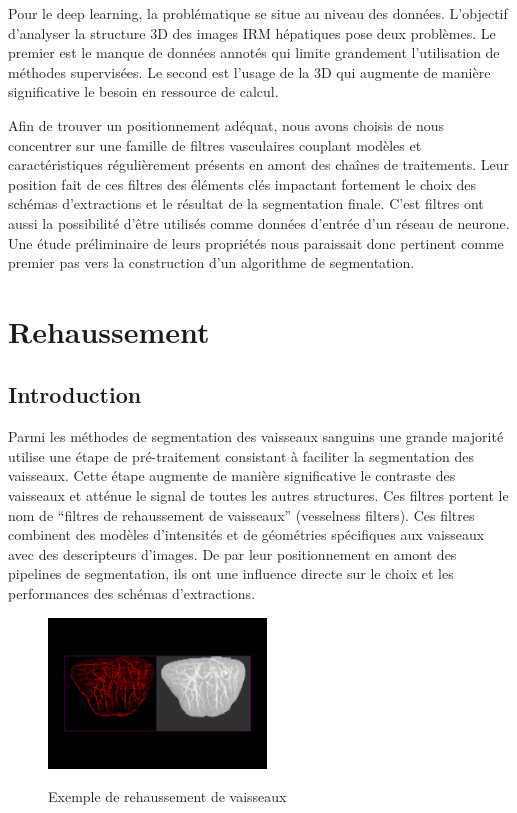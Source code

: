 Pour le deep learning, la problématique se situe au niveau des données. L'objectif d'analyser la structure 3D des images IRM hépatiques pose deux problèmes. Le premier est le manque de données annotés qui limite grandement l'utilisation de méthodes supervisées. Le second est l'usage de la 3D qui augmente de manière significative le besoin en ressource de calcul.

Afin de trouver un positionnement adéquat, nous avons choisis de nous concentrer sur une famille de filtres vasculaires couplant modèles et caractéristiques régulièrement présents en amont des chaînes de traitements. Leur position fait de ces filtres des éléments clés impactant fortement le choix des schémas d'extractions et le résultat de la segmentation finale. C'est filtres ont aussi la possibilité d'être utilisés comme données d'entrée d'un réseau de neurone. Une étude préliminaire de leurs propriétés nous paraissait donc pertinent comme premier pas vers la construction d'un algorithme de segmentation.

\section{Rehaussement}
\label{sec:EA:rehaussement}
\subsection{Introduction}
\label{sec:EA:rehaussement:introduction}

Parmi les méthodes de segmentation des vaisseaux sanguins une grande majorité utilise une étape de pré-traitement consistant à faciliter la segmentation des vaisseaux. Cette étape augmente de manière significative le contraste des vaisseaux et atténue le signal de toutes les autres structures. Ces filtres portent le nom de ``filtres de rehaussement de vaisseaux'' (vesselness filters). Ces filtres combinent des modèles d'intensités et de géométries spécifiques aux vaisseaux avec des descripteurs d'images. De par leur positionnement en amont des pipelines de segmentation, ils ont une influence directe sur le choix et les performances des schémas d'extractions.

\begin{figure}
  \centering
  \includegraphics[height=4cm]{Images/vessels_enhancement.png}
  \label{fig:placeholder}
  \caption{Exemple de rehaussement de vaisseaux}
\end{figure}


